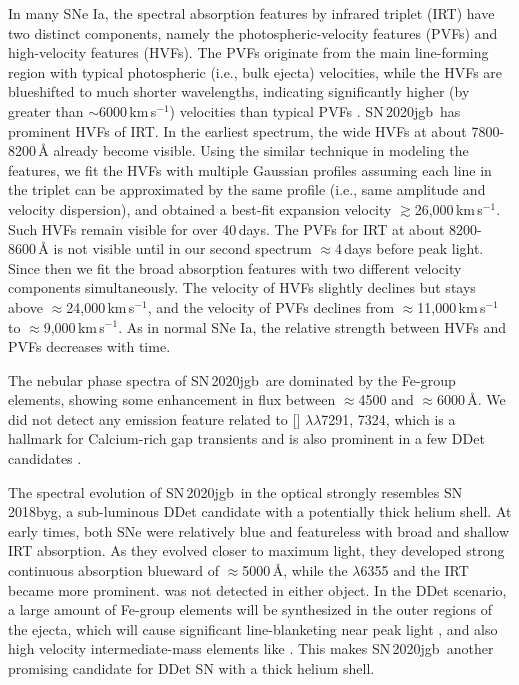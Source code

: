 \documentclass[twocolumn]{aastex631}
\newcommand{\sn}{SN\,2020jgb}
\begin{document}
In many SNe Ia, the spectral absorption features by  infrared triplet (IRT) have two distinct components, namely the photospheric-velocity features (PVFs) and high-velocity features (HVFs). The PVFs originate from the main line-forming region with typical photospheric (i.e., bulk ejecta) velocities, while the HVFs are blueshifted to much shorter wavelengths, indicating significantly higher (by greater than $\sim$6000\,km\,s$^{-1}$) velocities than typical PVFs \citep{Silverman_HVF_2015}. \sn\ has prominent HVFs of  IRT. In the earliest spectrum, the wide HVFs at about 7800-8200\,\r{A} already become visible. Using the similar technique in modeling the  features, we fit the HVFs with multiple Gaussian profiles assuming each line in the triplet can be approximated by the same profile (i.e., same amplitude and velocity dispersion), and obtained a best-fit expansion velocity $\gtrsim$26,000\,km\,s$^{-1}$. Such HVFs remain visible for over 40\,days. The PVFs for  IRT at about 8200-8600\,\r{A} is not visible until in our second spectrum $\approx$4\,days before peak light. Since then we fit the broad absorption features with two different velocity components simultaneously. The velocity of HVFs slightly declines but stays above $\approx$24,000\,km\,s$^{-1}$, and the velocity of PVFs declines from $\approx$11,000\,km\,s$^{-1}$ to $\approx$9,000\,km\,s$^{-1}$. As in normal SNe Ia, the relative strength between HVFs and PVFs decreases with time.

The nebular phase spectra of \sn\ are dominated by the Fe-group elements, showing some enhancement in flux between $\approx$4500 and $\approx$6000\,\r{A}. We did not detect any emission feature related to [] $\lambda\lambda$7291, 7324, which is a hallmark for Calcium-rich gap transients and is also prominent in a few DDet candidates \citep[e.g., SN\,2016hnk and SN\,2019ofm;][]{De_Ca-rich_2020}. 

The spectral evolution of \sn\ in the optical strongly resembles SN\,2018byg, a sub-luminous DDet candidate with a potentially thick helium shell. At early times, both SNe were relatively blue and featureless with broad and shallow  IRT absorption. As they evolved closer to maximum light, they developed strong continuous absorption blueward of $\approx$5000\,\r{A}, while the  $\lambda$6355 and the  IRT became more prominent.  was not detected in either object. In the DDet scenario, a large amount of Fe-group elements will be synthesized in the outer regions of the ejecta, which will cause significant line-blanketing near peak light \citep{Kromer_DD_2010, polin_observational_2019}, and also high velocity intermediate-mass elements like  \citep{Fink_DD_2010, Kromer_DD_2010}. This makes \sn\ another promising candidate for DDet SN with a thick helium shell. 
\end{document}
